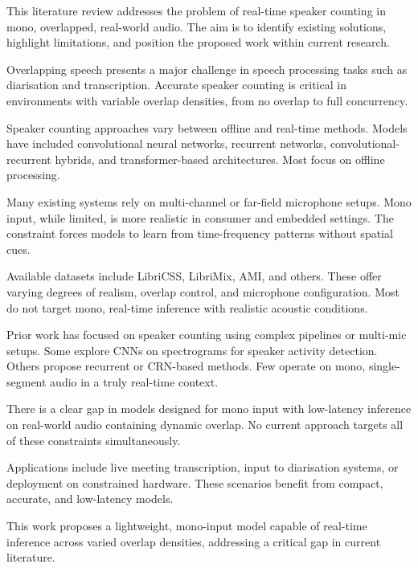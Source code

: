 This literature review addresses the problem of real-time speaker counting in mono, overlapped, real-world audio. The aim is to identify existing solutions, highlight limitations, and position the proposed work within current research.

Overlapping speech presents a major challenge in speech processing tasks such as diarisation and transcription. Accurate speaker counting is critical in environments with variable overlap densities, from no overlap to full concurrency.

Speaker counting approaches vary between offline and real-time methods. Models have included convolutional neural networks, recurrent networks, convolutional-recurrent hybrids, and transformer-based architectures. Most focus on offline processing.

Many existing systems rely on multi-channel or far-field microphone setups. Mono input, while limited, is more realistic in consumer and embedded settings. The constraint forces models to learn from time-frequency patterns without spatial cues.

Available datasets include LibriCSS, LibriMix, AMI, and others. These offer varying degrees of realism, overlap control, and microphone configuration. Most do not target mono, real-time inference with realistic acoustic conditions.

Prior work has focused on speaker counting using complex pipelines or multi-mic setups. Some explore CNNs on spectrograms for speaker activity detection. Others propose recurrent or CRN-based methods. Few operate on mono, single-segment audio in a truly real-time context.

There is a clear gap in models designed for mono input with low-latency inference on real-world audio containing dynamic overlap. No current approach targets all of these constraints simultaneously.

Applications include live meeting transcription, input to diarisation systems, or deployment on constrained hardware. These scenarios benefit from compact, accurate, and low-latency models.

This work proposes a lightweight, mono-input model capable of real-time inference across varied overlap densities, addressing a critical gap in current literature.